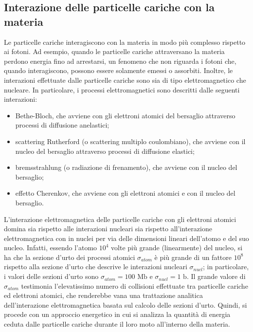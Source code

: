 \documentclass[12pt,a4paper,twoside]{report}
\begin{document}
	\subsection{Interazione delle particelle cariche con la materia}
	Le particelle cariche interagiscono con la materia in modo più complesso rispetto ai fotoni. Ad esempio, quando le particelle cariche attraversano la materia perdono energia fino ad arrestarsi, un fenomeno che non riguarda i fotoni che, quando interagiscono, possono essere solamente emessi o assorbiti. Inoltre, le interazioni effettuate dalle particelle cariche sono sia di tipo elettromagnetico che nucleare. In particolare, i processi elettromagnetici sono descritti dalle seguenti interazioni:
	\begin{itemize}
		\item Bethe-Bloch, che avviene con gli elettroni atomici del bersaglio attraverso processi di diffusione anelastici;
		\item scattering Rutherford (o scattering multiplo coulombiano), che avviene con il nucleo del bersaglio attraverso processi di diffusione elastici;
		\item bremsstrahlung (o radiazione di frenamento), che avviene con il nucleo del bersaglio;
		\item effetto Cherenkov, che avviene con gli elettroni atomici e con il nucleo del bersaglio.
	\end{itemize}
	L'interazione elettromagnetica delle particelle cariche con gli elettroni atomici domina sia rispetto alle interazioni nucleari sia rispetto all'interazione elettromagnetica con in nuclei per via delle dimensioni lineari dell'atomo e del suo nucleo. Infatti, essendo l'atomo $10^4$ volte più grande (linearmente) del nucleo, si ha che la sezione d'urto dei processi atomici $\sigma_{atom}$ è più grande di un fattore $10^8$ rispetto alla sezione d'urto che descrive le interazioni nucleari $\sigma_{nucl}$; in particolare, i valori delle sezioni d'urto sono $\sigma_{atom}=100\mbox{ Mb}$ e $\sigma_{nucl}=1\mbox{ b}$. Il grande valore di $\sigma_{atom}$ testimonia l'elevatissimo numero di collisioni effettuate tra particelle cariche ed elettroni atomici, che renderebbe vana una trattazione analitica dell'interazione elettromagnetica basata sul calcolo delle sezioni d'urto. Quindi, si procede con un approccio energetico in cui si analizza la quantità di energia ceduta dalle particelle cariche durante il loro moto all'interno della materia.
	
\end{document}
